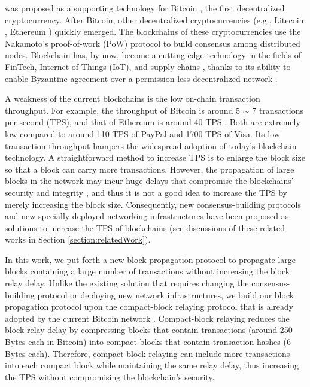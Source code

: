 \documentclass[10pt,journal,compsoc]{IEEEtran}
\begin{document}
% 
% 
% 
% 
 was proposed as a supporting technology for Bitcoin \cite{nakamoto2019bitcoin}, the first decentralized cryptocurrency. After Bitcoin, other decentralized cryptocurrencies (e.g., Litecoin \cite {reed2017litecoin}, Ethereum \cite{wood2014ethereum}) quickly emerged. The blockchains of these cryptocurrencies use the Nakamoto's proof-of-work (PoW) protocol to build consensus among distributed nodes. Blockchain has, by now, become a cutting-edge technology in the fields of FinTech, Internet of Things (IoT), and supply chains \cite{du2019affordances,kshetri2017can,kouhizadeh2018blockchain}, thanks to its ability to enable Byzantine agreement over a permission-less decentralized network \cite{singh2016blockchain}. 

A weakness of the current blockchains is the low on-chain transaction throughput. For example, the throughput of Bitcoin is around 5 $\sim$ 7 transactions per second (TPS), and that of Ethereum is around 40 TPS \cite{gobel2017increased}. Both are extremely low compared to around 110 TPS of PayPal and 1700 TPS of Visa. Its low transaction throughput hampers the widespread adoption of today's blockchain technology. A straightforward method to increase TPS is to enlarge the block size so that a block can carry more transactions. However, the propagation of large blocks in the network may incur huge delays that compromise the blockchains' security and integrity \cite{gervais2016security}, and thus it is not a good idea to increase the TPS by merely increasing the block size. Consequently, new consensus-building protocols and new specially deployed networking infrastructures have been proposed as solutions to increase the TPS of blockchains (see discussions of these related works in Section \ref{section:relatedWork}).  

In this work, we put forth a new block propagation protocol to propagate large blocks containing a large number of transactions without increasing the block relay delay. Unlike the existing solution that requires changing the consensus-building protocol or deploying new network infrastructures, we build our block propagation protocol upon the compact-block relaying protocol that is already adopted by the current Bitcoin network \cite{corallo2017compact}. Compact-block relaying reduces the block relay delay by compressing blocks that contain transactions (around 250 Bytes each in Bitcoin) into compact blocks that contain transaction hashes (6 Bytes each). Therefore, compact-block relaying can include more transactions into each compact block while maintaining the same relay delay, thus increasing the TPS without compromising the blockchain's security. 
\end{document}
